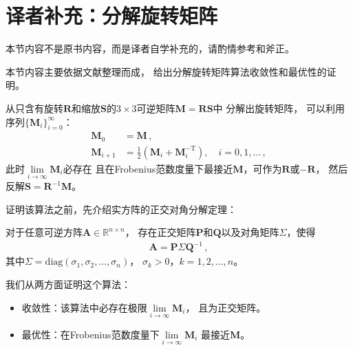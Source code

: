 \section{译者补充：分解旋转矩阵}\label{sec:译者补充：分解旋转矩阵}
\begin{remark}
    本节内容不是原书内容，而是译者自学补充的，请酌情参考和斧正。
\end{remark}

本节内容主要依据文献\citep{doi:10.1137/0907079,10.5555/155294.155324}整理而成，
给出分解旋转矩阵算法收敛性和最优性的证明。

从只含有旋转$\bm R$和缩放$\bm S$的$3\times3$可逆矩阵$\bm M=\bm R\bm S$中
分解出旋转矩阵，
可以利用序列$\displaystyle\{\bm M_i\}_{i=0}^{\infty}$：
\begin{align}
    \bm M_0     & =\bm M\, ,                                                         \\
    \bm M_{i+1} & =\frac{1}{2}(\bm M_i+\bm M_i^{-\mathrm{T}}),\quad i=0,1,\ldots\, ,
\end{align}
此时$\displaystyle \lim\limits_{i \to \infty}{\bm M_i}$必存在
且在Frobenius范数度量下最接近$\bm M$，可作为$\bm R$或$-\bm R$，
然后反解$\bm S=\bm R^{-1}\bm M$。

证明该算法之前，先介绍实方阵的正交对角分解定理：
\begin{theorem}
    对于任意可逆方阵$\bm A\in\mathbb{R}^{n\times n}$，
    存在正交矩阵$\bm P$和$\bm Q$以及对角矩阵$\bm \varSigma$，使得
    \begin{align}
        \bm A=\bm P\bm \varSigma\bm Q^{-1}\, ,
    \end{align}
    其中$\bm \varSigma=\mathrm{diag}(\sigma_1,\sigma_2,\ldots,\sigma_n)$，
    $\sigma_k>0$，$k=1,2,\ldots,n$。
\end{theorem}

我们从两方面证明这个算法：
\begin{itemize}
    \item 收敛性：该算法中必存在极限$\displaystyle\lim\limits_{i\rightarrow\infty}\bm M_i$，
          且为正交矩阵。
    \item 最优性：在Frobenius范数度量下$\displaystyle\lim\limits_{i\rightarrow\infty}\bm M_i$
          最接近$\bm M$。
\end{itemize}

